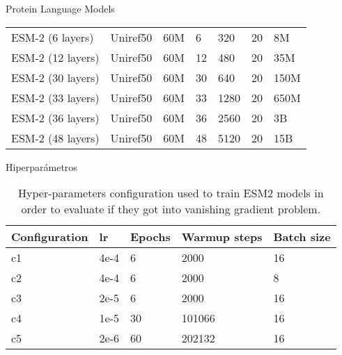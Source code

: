 \documentclass[10pt]{beamer}
\newcommand{\1}{
	\setbeamertemplate{background}{
		\texttt{[image: ../img/1]}
		\tikz[overlay] \fill[fill opacity=0.75,fill=white] (0,0) rectangle (-\paperwidth,\paperheight);
	}
}
\begin{document}
\begin{frame}{Protein Language Models}{}
\begin{table}[h]
{\begin{tabular}{lllllll}
					ESM-2 (6 layers)  & Uniref50         & 60M                   & 6               & 320                  & 20                       & 8M                  \\
					ESM-2 (12 layers)  & Uniref50         & 60M                   & 12              & 480                  & 20                       & 35M                 \\
					ESM-2 (30 layers) & Uniref50         & 60M                   & 30              & 640                  & 20                       & 150M                \\
					ESM-2 (33 layers)  & Uniref50         & 60M                   & 33              & 1280                 & 20                       & 650M               \\
					
					ESM-2 (36 layers)  & Uniref50         & 60M                   & 36              & 2560                 & 20                       & 3B               \\
					
					ESM-2 (48 layers)  & Uniref50         & 60M                   & 48              & 5120                 & 20                       & 15B               \\
					
			\end{tabular}}
			
		\end{table}
		
	\end{frame}

	
\begin{frame}{Hiperparámetros}{}
	\begin{table}[]
		\centering
		\caption{Hyper-parameters configuration used to train ESM2 models in order to evaluate if they got into vanishing gradient problem.}
		\label{tab:configurations}
		
		\begin{tabular}{lllll} 
			\textbf{Configuration} & \textbf{lr}            & \textbf{Epochs} & \textbf{Warmup steps} & \textbf{Batch size}       \\ \hline
			c1 & 4e-4 & 6 & 2000 & 16 \\
			c2 & 4e-4 & 6 & 2000 & 8 \\
			c3 & 2e-5 & 6 & 2000 & 16 \\
			c4 & 1e-5 & 30 & 101066 & 16 \\
			c5 & 2e-6 & 60 & 202132 & 16 \\
			
		\end{tabular}
	\end{table}
\end{frame}
\end{document}
